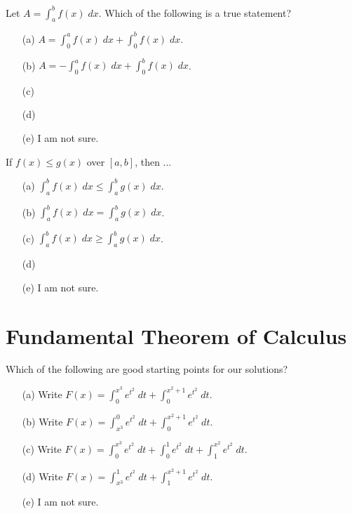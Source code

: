 \documentclass[14pt]{beamer}
\begin{document}
\begin{frame}[t]
  Let \(A = \int_{a}^{b} f(x) \;dx\). Which of the following is a true statement?

  \begin{itemize} \setlength\itemsep{1ex}
    \item[(a)] \(A = \int_{0}^{a} f(x) \;dx + \int_{0}^{b} f(x) \;dx\).
    \item[(b)] \(A = -\int_{0}^{a} f(x) \;dx + \int_{0}^{b} f(x) \;dx\).
    \item[(c)] 
    \item[(d)] 
    \item[(e)] I am not sure.
  \end{itemize} 
\end{frame}

\begin{frame}[t]
  If \(f(x) \le g(x)\) over \([a,b]\), then ...

  \begin{itemize} \setlength\itemsep{1ex}
    \item[(a)] \(\int_{a}^{b} f(x) \;dx \le \int_{a}^{b} g(x) \;dx\).
    \item[(b)] \(\int_{a}^{b} f(x) \;dx = \int_{a}^{b} g(x) \;dx\).
    \item[(c)] \(\int_{a}^{b} f(x) \;dx \ge \int_{a}^{b} g(x) \;dx\).
    \item[(d)] 
    \item[(e)] I am not sure.
  \end{itemize} 
\end{frame}

\section{Fundamental Theorem of Calculus}
\begin{frame}[t]
  Which of the following are good starting points for our solutions?

  \begin{enumerate} \setlength\itemsep{1ex}
    \item[(a)] Write \(F(x) = \int_{0}^{x^{3}} e^{t^{2}} \;dt + \int_{0}^{x^{2}+1} e^{t^{2}} \;dt \).
    \item[(b)] Write \(F(x) = \int_{x^{3}}^{0} e^{t^{2}} \;dt + \int_{0}^{x^{2}+1} e^{t^{2}} \;dt \).
    \item[(c)] Write \(F(x) = \int_{0}^{x^{3}} e^{t^{2}} \;dt + \int_{0}^{1} e^{t^{2}} \;dt + \int_{1}^{x^{2}} e^{t^{2}} \;dt\).
    \item[(d)] Write \(F(x) = \int_{x^{3}}^{1} e^{t^{2}} \;dt + \int_{1}^{x^{2}+1} e^{t^{2}} \;dt \).
    \item[(e)] I am not sure.
  \end{enumerate}
\end{frame}
\end{document}
